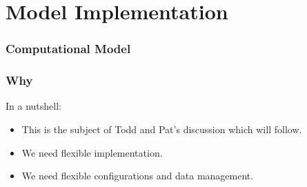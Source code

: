 \documentclass{beamer}
\begin{document}
\section{Model Implementation}




\begin{frame}
  \frametitle{Computational Model}
\end{frame}


\begin{frame}
  \frametitle{Why}

  {In a nutshell:}

  \begin{itemize}
  \item<1-> This is the subject of Todd and Pat's discussion which
    will follow.
  \item<2-> We need flexible implementation.
  \item<2-> We need flexible configurations and data management.
  \end{itemize}
  

\end{frame}
\end{document}
